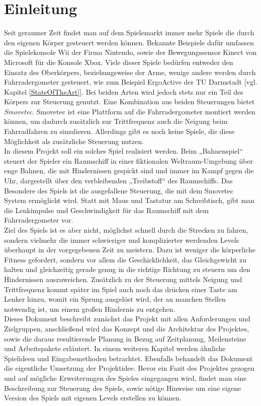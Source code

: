\chapter{Einleitung}
Seit geraumer Zeit findet man auf dem Spielemarkt immer mehr Spiele die durch den eigenen Körper gesteuert werden können. Bekannte Beispiele dafür umfassen die Spielekonsole Wii der Firma Nintendo, sowie der Bewegungssensor Kinect von Microsoft für die Konsole Xbox. Viele dieser Spiele bedürfen entweder den Einsatz des Oberkörpers, beziehungsweise der Arme, wenige andere werden durch Fahrradergometer gesteuert, wie zum Beispiel ErgoActive der TU Darmstadt [vgl. Kapitel \ref{StateOfTheArt}]. Bei beiden Arten wird jedoch stets nur ein Teil des Körpers zur Steuerung genutzt. Eine Kombination aus beiden Steuerungen bietet \textit{Smovetec}. Smovetec ist eine Plattform auf die Fahrradergometer montiert werden können, um dadurch zusätzlich zur Trittfrequenz auch die Neigung beim Fahrradfahren zu simulieren. Allerdings gibt es noch keine Spiele, die diese Möglichkeit als zusätzliche Steuerung nutzen. \\
In diesem Projekt soll ein solches Spiel realisiert werden. Beim „Bahnenspiel“ steuert der Spieler ein Raumschiff in einer fiktionalen Weltraum-Umgebung über enge Bahnen, die mit Hindernissen gespickt sind und immer im Kampf gegen die Uhr, dargestellt über den verbleibenden „Treibstoff“ des Raumschiffs. Das Besondere des Spiels ist die ausgefallene Steuerung, die mit dem Smovetec System ermöglicht wird. Statt mit Maus und Tastatur am Schreibtisch, gibt man die Lenkimpulse und Geschwindigkeit für das Raumschiff mit dem Fahrradergometer vor.\\
Ziel des Spiels ist es aber nicht, möglichst schnell durch die Strecken zu fahren, sondern vielmehr die immer schwieriger und komplizierter werdenden Levels überhaupt in der vorgegebenen Zeit zu meistern. Dazu ist weniger die körperliche Fitness gefordert, sondern vor allem die Geschicklichkeit, das Gleichgewicht zu halten und gleichzeitig gerade genug in die richtige Richtung zu steuern um den Hindernissen auszuweichen. Zusätzlich zu der Steuerung mittels Neigung und Trittfrequenz kommt später im Spiel auch noch das drücken einer Taste am Lenker hinzu, womit ein Sprung ausgelöst wird, der an manchen Stellen notwendig ist, um einem großen Hindernis zu entgehen. \\
Dieses Dokument beschreibt zunächst das Projekt mit allen Anforderungen und Zielgruppen, anschließend wird das Konzept und die Architektur des Projektes, sowie die daraus resultierende Planung in Bezug auf Zeitplanung, Meilensteine und Arbeitspakete erläutert.
In einem weiteren Kapitel werden ähnliche Spielideen und Eingabemethoden betrachtet. Ebenfalls behandelt das Dokument die eigentliche Umsetzung der Projektidee. Bevor ein Fazit des Projektes gezogen und auf mögliche Erweiterungen des Spieles eingegangen wird, findet man eine Beschreibung zur Steuerung des Spiels, sowie nötige Hinweise um eine eigene Version des Spiels mit eigenen Levels erstellen zu können.
